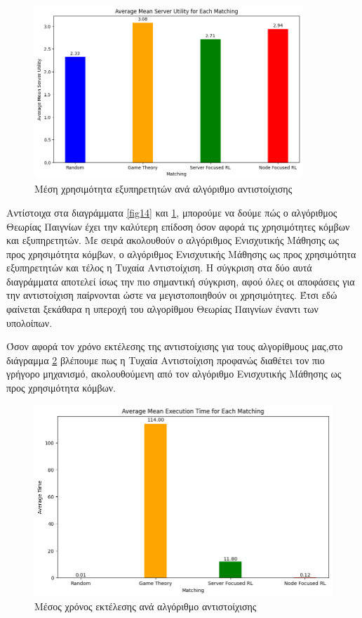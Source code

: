\begin{figure}[H]
    \centering
    \includegraphics[width=0.9\textwidth]{figures/chapter3/Average_Mean_Server_Utility.png}
    \caption{Μέση χρησιμότητα εξυπηρετητών ανά αλγόριθμο αντιστοίχισης}
    \label{fig15}
\end{figure}

\newpage

Αντίστοιχα στα διαγράμματα \ref*{fig14} και \ref*{fig15}, μπορούμε να δούμε πώς ο αλγόριθμος Θεωρίας Παιγνίων έχει την καλύτερη επίδοση όσον αφορά τις χρησιμότητες κόμβων και εξυπηρετητών. Με σειρά ακολουθούν ο αλγόριθμος Ενισχυτικής Μάθησης ως προς χρησιμότητα κόμβων, ο αλγόριθμος Ενισχυτικής Μάθησης ως προς χρησιμότητα εξυπηρετητών και τέλος η Τυχαία Αντιστοίχιση. Η σύγκριση στα δύο αυτά διαγράμματα αποτελεί ίσως την πιο σημαντική σύγκριση, αφού όλες οι αποφάσεις για την αντιστοίχιση παίρνονται ώστε να μεγιστοποιηθούν οι χρησιμότητες. Έτσι εδώ φαίνεται ξεκάθαρα η υπεροχή του αλγορίθμου Θεωρίας Παιγνίων έναντι των υπολοίπων.

Όσον αφορά τον χρόνο εκτέλεσης της αντιστοίχισης για τους αλγορίθμους μας,στο διάγραμμα \ref{fig16} βλέπουμε πως η Τυχαία Αντιστοίχιση προφανώς διαθέτει τον πιο γρήγορο μηχανισμό, ακολουθούμενη από τον αλγόριθμο Ενισχυτικής Μάθησης ως προς χρησιμότητα κόμβων.

\begin{figure}[ht]
    \centering
    \includegraphics[width=\textwidth]{figures/chapter3/Average_Time.png}
    \caption{Μέσος χρόνος εκτέλεσης ανά αλγόριθμο αντιστοίχισης}
    \label{fig16}
\end{figure}

